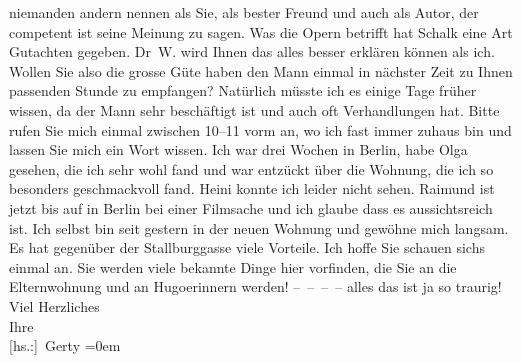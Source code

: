 \begin{ledgroupsized}[t]{13cm}
               niemanden andern nennen als Sie, als bester Freund und auch als Autor, der competent
               ist seine Meinung zu sagen. Was die Opern betrifft hat Schalk eine Art Gutachten gegeben. Dr W. wird Ihnen das alles besser erklären können als ich.
               Wollen Sie also die grosse Güte haben den Mann einmal in nächster Zeit zu \label{T_L02535-1v}\label{T_L02535-1h} Ihnen passenden
               Stunde zu empfangen? Natürlich müsste ich es einige Tage früher wissen, da der Mann sehr beschäftigt ist und auch oft
               Verhandlungen hat. Bitte rufen Sie mich einmal zwischen 10–11 vorm an,
               wo ich fast immer zuhaus bin und lassen Sie mich ein Wort wissen.\pend
           \pstart
           Ich war drei Wochen in Berlin, habe Olga gesehen, die ich sehr wohl fand und war
               entzückt über die Wohnung, die ich so besonders geschmackvoll fand. Heini konnte ich leider nicht sehen. Raimund ist jetzt bis auf \label{T_L02535-2v}\label{T_L02535-2h} in Berlin bei einer Filmsache und ich glaube dass es aussichtsreich ist. Ich
               selbst bin seit gestern in der neuen Wohnung und gewöhne mich langsam. Es hat
               gegenüber der Stallburggasse viele
               Vorteile.\pend
           \pstart
           Ich hoffe Sie schauen sichs einmal an. Sie werden viele bekannte Dinge hier
               vorfinden, die Sie an die Elternwohnung und an Hugoerinnern werden! – – – – alles das ist
               ja so traurig!\pend
           \pstart
           Viel Herzliches{\\[\baselineskip]}Ihre{\\[\baselineskip]}\spacefill\mbox{{[}hs.:{]} Gerty}\pend
           \leftskip=0em{}
         

\end{ledgroupsized}
